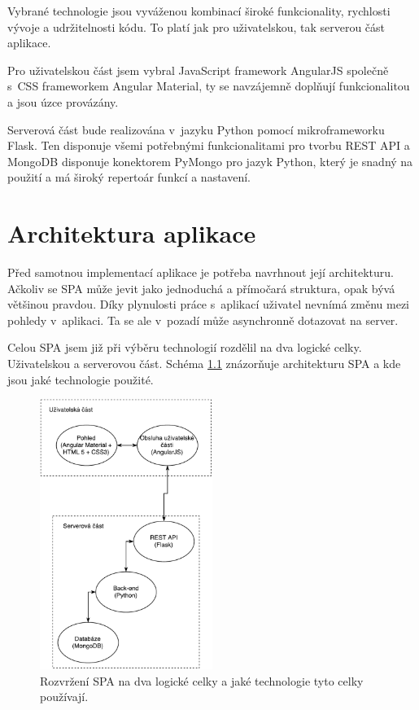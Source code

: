 Vybrané technologie jsou vyváženou kombinací široké funkcionality, rychlosti vývoje a udržitelnosti kódu. To platí jak pro uživatelskou, tak serverou část aplikace.

Pro uživatelskou část jsem vybral JavaScript framework AngularJS společně s~CSS frameworkem Angular Material, ty se navzájemně doplňují funkcionalitou a jsou úzce provázány.

Serverová část bude realizována v~jazyku Python pomocí mikroframeworku Flask. Ten disponuje všemi potřebnými funkcionalitami pro tvorbu REST API a MongoDB disponuje konektorem PyMongo pro jazyk Python, který je snadný na použití a má široký repertoár funkcí a nastavení.

\chapter{Architektura aplikace}
\label{architektura}

Před samotnou implementací aplikace je potřeba navrhnout její architekturu. Ačkoliv se SPA může jevit jako jednoduchá a přímočará struktura, opak bývá většinou pravdou. Díky plynulosti práce s~aplikací uživatel nevnímá změnu mezi pohledy v~aplikaci. Ta se ale v~pozadí může asynchronně dotazovat na server.

Celou SPA jsem již při výběru technologií rozdělil na dva logické celky. Uživatelskou a serverovou část. Schéma \ref{fig:system} znázorňuje architekturu SPA a kde jsou jaké technologie použité.

\begin{figure}[ht]
    \centering
    \includegraphics[width=0.5\textwidth]{fig/SPA.pdf}
    \caption{Rozvržení SPA na dva logické celky a jaké technologie tyto celky používají.} \label{fig:system}
\end{figure}

